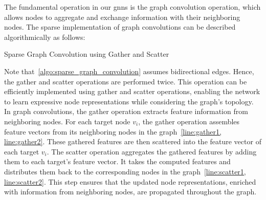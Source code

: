 The fundamental operation in our \acp{gnn} is the graph convolution operation, which allows nodes to aggregate and exchange information with their neighboring nodes.
The sparse implementation of graph convolutions can be described algorithmically as follows:
\begin{algorithm}[H]
    \caption{Sparse Graph Convolution using Gather and Scatter}\label{algo:sparse_graph_convolution}
    \begin{algorithmic}[1]
         \label{line:gather1}
         \label{line:gather2}
          \label{line:scatter1}
          \label{line:scatter2}
         \label{line:sum}
         \label{line:res}
        \EndFunction{}
    \end{algorithmic}
\end{algorithm}
Note that~\cref{algo:sparse_graph_convolution} assumes bidirectional edges. Hence, the gather and scatter operations are performed twice.
This operation can be efficiently implemented using gather and scatter operations, enabling the network to learn expressive node representations while considering the graph's topology.
In graph convolutions, the gather operation extracts feature information from neighboring nodes.
For each target node $v_{i}$, the gather operation assembles feature vectors from its neighboring nodes in the graph~\cref{line:gather1, line:gather2}.
These gathered features are then scattered into the feature vector of each target $v_{i}$.
The scatter operation aggregates the gathered features by adding them to each target's feature vector.
It takes the computed features and distributes them back to the corresponding nodes in the graph~\cref{line:scatter1, line:scatter2}.
This step ensures that the updated node representations, enriched with information from neighboring nodes, are propagated throughout the graph.

